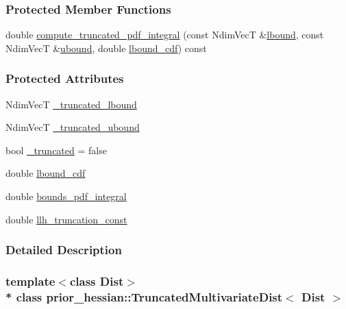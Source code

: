 \subsubsection*{Protected Member Functions}
\begin{DoxyCompactItemize}
\item 
double \hyperlink{classprior__hessian_1_1TruncatedMultivariateDist_ac635169eac9ab2595d0a6161a4de85a6}{compute\+\_\+truncated\+\_\+pdf\+\_\+integral} (const Ndim\+VecT \&\hyperlink{classprior__hessian_1_1TruncatedMultivariateDist_ab66c6542efa3e4c4b302c3412def22da}{lbound}, const Ndim\+VecT \&\hyperlink{classprior__hessian_1_1TruncatedMultivariateDist_a9ac92816ee8fb9c9c0c174e961bbfc81}{ubound}, double \hyperlink{classprior__hessian_1_1TruncatedMultivariateDist_a8c7ed29f5fe119b5451a56d89027d35b}{lbound\+\_\+cdf}) const 
\end{DoxyCompactItemize}
\subsubsection*{Protected Attributes}
\begin{DoxyCompactItemize}
\item 
Ndim\+VecT \hyperlink{classprior__hessian_1_1TruncatedMultivariateDist_a643aef19d581cabbc890ddda4dc7077f}{\+\_\+truncated\+\_\+lbound}
\item 
Ndim\+VecT \hyperlink{classprior__hessian_1_1TruncatedMultivariateDist_abeef4b19f31c7c704ec6688ffa8f5d68}{\+\_\+truncated\+\_\+ubound}
\item 
bool \hyperlink{classprior__hessian_1_1TruncatedMultivariateDist_a2b7e1a11ae07ab44fd9c7944c2ddd487}{\+\_\+truncated} = false
\item 
double \hyperlink{classprior__hessian_1_1TruncatedMultivariateDist_a8c7ed29f5fe119b5451a56d89027d35b}{lbound\+\_\+cdf}
\item 
double \hyperlink{classprior__hessian_1_1TruncatedMultivariateDist_a1685d6c30bd68315d20a8367b38e30f4}{bounds\+\_\+pdf\+\_\+integral}
\item 
double \hyperlink{classprior__hessian_1_1TruncatedMultivariateDist_aaf6c13180dd673f90ec8fc155c7beb2f}{llh\+\_\+truncation\+\_\+const}
\end{DoxyCompactItemize}


\subsubsection{Detailed Description}
\subsubsection*{template$<$class Dist$>$\\*
class prior\+\_\+hessian\+::\+Truncated\+Multivariate\+Dist$<$ Dist $>$}



